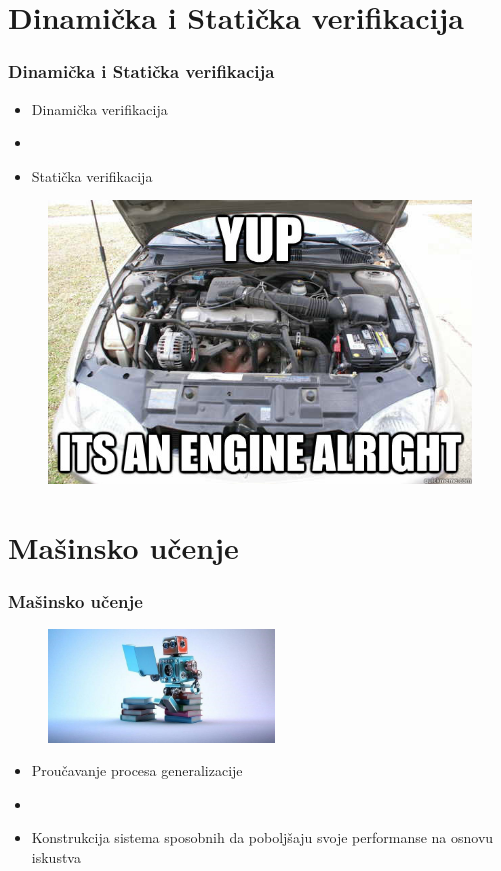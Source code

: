 \documentclass[14pt]{beamer}
\begin{document}
\section{Dinamička i Statička verifikacija}
\begin{frame}
\frametitle{Dinamička i Statička verifikacija}
\begin{itemize}
\item Dinamička verifikacija
\item[]
\item Statička verifikacija
\end{itemize}

\begin{figure}
\includegraphics[width=0.5\linewidth]{engine}
\end{figure}

\end{frame}


\section{Mašinsko učenje}
\begin{frame}
\frametitle{Mašinsko učenje}

\begin{figure}
\includegraphics[width=0.5\linewidth, height=3cm]{machine-learning}
\end{figure}

\begin{itemize}
\item Proučavanje procesa generalizacije 
\item[]
\item Konstrukcija sistema sposobnih da poboljšaju svoje performanse na osnovu iskustva
\end{itemize}

\end{frame}
\end{document}
